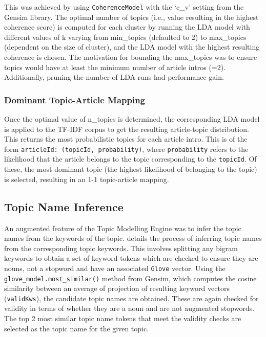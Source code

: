 This was achieved by using \texttt{CoherenceModel} with the `c\_v' setting from the Gensim library. The optimal number of topics (i.e., value resulting in the highest coherence score) is computed for each cluster by running the LDA model with different values of k varying from min\_topics (defaulted to 2) to max\_topics (dependent on the size of cluster), and the LDA model with the highest resulting coherence is chosen. The motivation for bounding the max\_topics was to ensure topics would have at least the minimum number of article intros (=2). Additionally, pruning the number of LDA runs had performance gain.

\subsubsection*{Dominant Topic-Article Mapping} \label{sec:topic_article_mapping}
Once the optimal value of n\_topics is determined, the corresponding LDA model is applied to the TF-IDF corpus to get the resulting article-topic distribution. This returns the most probabilistic topics for each article intro. This is of the form \texttt{articleId: (topicId, probability)}, where \texttt{probability} refers to the likelihood that the article belongs to the topic corresponding to the \texttt{topicId}. Of these, the most dominant topic (the highest likelihood of belonging to the topic) is selected, resulting in an 1-1 topic-article mapping. 

\vspace{-1ex}
\subsection*{Topic Name Inference}

An augmented feature of the Topic Modelling Engine was to infer the topic names from the keywords of the topic.  details the process of inferring topic names from the corresponding topic keywords. This involves splitting any bigram keywords to obtain a set of keyword tokens which are checked to ensure they are nouns, not a stopword and have an associated \texttt{Glove} vector. Using the \texttt{glove\_model.most\_similar()} method from Gensim, which computes the cosine similarity between an average of projection of resulting keyword vectors (\texttt{validKws}), the candidate topic names are obtained. These are again checked for validity in terms of whether they are a noun and are not augmented stopwords. The top 2 most similar topic name tokens that meet the validity checks are selected as the topic name for the given topic. 

